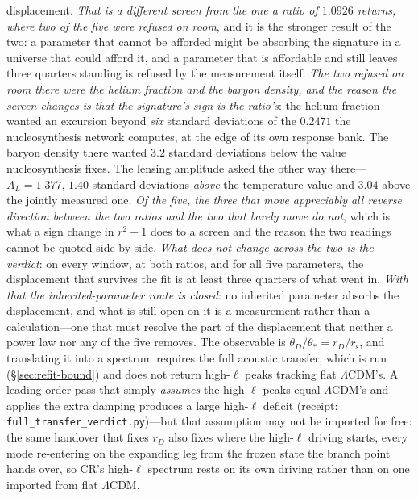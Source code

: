 \documentclass[11pt,a4paper]{article}
\theoremstyle{plain}
\theoremstyle{definition}
\theoremstyle{remark}
\newcommand{\rs}{r_{\mathrm{s}}}
\begin{document}
displacement. \emph{That is a different screen from the one a ratio of $1.0926$ returns, where two of the five were refused on room}, and it is the stronger result of the two: a parameter that cannot be afforded might be absorbing the signature in a universe that could afford it, and a parameter that is affordable and still leaves three quarters standing is refused by the measurement itself. \emph{The two refused on room there were the helium fraction and the baryon density, and the reason the screen changes is that the signature's sign is the ratio's}: the helium fraction wanted an excursion beyond \emph{six} standard deviations of the $0.2471$ the nucleosynthesis network computes, at the edge of its own response bank. The baryon density there wanted $3.2$ standard deviations below the value nucleosynthesis fixes. The lensing amplitude asked the other way there---$A_L=1.377$, $1.40$ standard deviations \emph{above} the temperature value and $3.04$ above the jointly measured one. \emph{Of the five, the three that move appreciably all reverse direction between the two ratios and the two that barely move do not}, which is what a sign change in $r^{2}-1$ does to a screen and the reason the two readings cannot be quoted side by side. \emph{What does not change across the two is the verdict}: on every window, at both ratios, and for all five parameters, the displacement that survives the fit is at least three quarters of what went in. \emph{With that the inherited-parameter route is closed}: no inherited parameter absorbs the displacement, and what is still open on it is a measurement rather than a calculation---one that must resolve the part of the displacement that neither a power law nor any of the five removes. The observable is $\theta_D/\theta_*=r_D/\rs$, and translating it into a spectrum requires the full acoustic transfer, which is run (\S\ref{sec:refit-bound}) and does not return high-$\ell$ peaks tracking flat $\Lambda$CDM's. A leading-order pass that simply \emph{assumes} the high-$\ell$ peaks equal $\Lambda$CDM's and applies the extra damping produces a large high-$\ell$ deficit (receipt: \texttt{full\_transfer\_verdict.py})---but that assumption may not be imported for free: the same handover that fixes $r_D$ also fixes where the high-$\ell$ driving starts, every mode re-entering on the expanding leg from the frozen state the branch point hands over, so CR's high-$\ell$ spectrum rests on its own driving rather than on one imported from flat $\Lambda$CDM.
\end{document}
